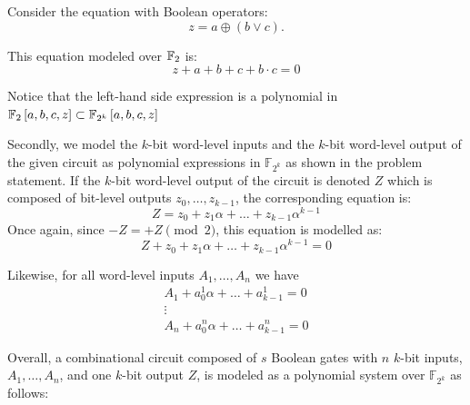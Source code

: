 \begin{Example}
Consider the equation with Boolean operators: 
\begin{equation}
z=a \oplus (b \vee c). \nonumber
\end{equation}

This equation modeled over ${\mathbb{F}}_2$ is:
\begin{equation}
z+a + b + c + b\cdot c=0 \nonumber
\end{equation}

Notice that the left-hand side expression is a polynomial in
${\mathbb{F}}_{2}\left[a,b,c,z\right] \subset
{\mathbb{F}}_{2^k}\left[a,b,c,z\right]$
\end{Example}

Secondly, we model the $k$-bit word-level inputs
and the $k$-bit word-level output of the given circuit as polynomial
expressions in $\mathbb{F}_{2^{k}}$ as shown in the problem statement.
If the $k$-bit word-level output of the circuit is denoted $Z$ which is 
composed of bit-level outputs 
$z_0, \dots , z_{k-1}$, the corresponding equation
is:
\begin{equation}
 Z = z_0 + z_1 \alpha + \dots + z_{k-1} \alpha^{k-1} \nonumber
\end{equation}
Once again, since $-Z = +Z \pmod 2$, this equation is modelled as:
\begin{equation}
Z + z_0 + z_1 \alpha + \dots + z_{k-1} \alpha^{k-1} = 0 \nonumber
\end{equation}

Likewise, for all word-level inputs $A_1,\dots,A_n$ we have
\begin{eqnarray}
A_1 + a_0^1 \alpha + \dots + a_{k-1}^1 = 0 \nonumber \\
\vdots \nonumber \\
A_n + a_0^n \alpha + \dots + a_{k-1}^n = 0 \nonumber 
\end{eqnarray}

Overall, a combinational circuit composed of $s$ Boolean gates
with $n$ $k$-bit inputs, $A_1, \dots , A_n$, and one $k$-bit output $Z$, 
is modeled as a polynomial system over $\mathbb{F}_{2^{k}}$ as follows:  

